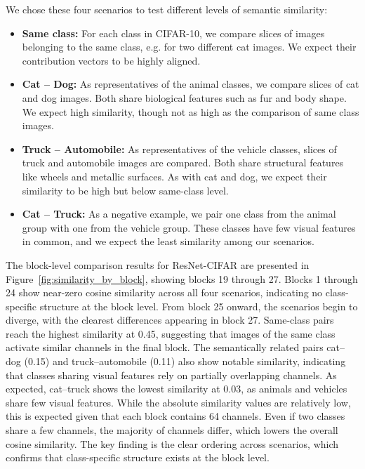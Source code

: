 \documentclass[
12pt,
fancyheadings,
a4paper,
twoside,
BCOR=0.7cm,
nobcorignoretitle,
grayscalebody,
]{stsreprt}
\begin{document}
We chose these four scenarios to test different levels of semantic similarity:
\begin{itemize}
    \item \textbf{Same class:} For each class in CIFAR-10, we compare slices of images belonging to the same class, e.g. for two different cat images. We expect their contribution vectors to be highly aligned.
    \item \textbf{Cat -- Dog:} As representatives of the animal classes, we compare slices of cat and dog images. Both share biological features such as fur and body shape. We expect high similarity, though not as high as the comparison of same class images.
    \item \textbf{Truck -- Automobile:} As representatives of the vehicle classes, slices of truck and automobile images are compared. Both share structural features like wheels and metallic surfaces. As with cat and dog, we expect their similarity to be high but below same-class level.
    \item \textbf{Cat -- Truck:} As a negative example, we pair one class from the animal group with one from the vehicle group. These classes have few visual features in common, and we expect the least similarity among our scenarios.
\end{itemize}

The block-level comparison results for ResNet-CIFAR are presented in
Figure~\ref{fig:similarity_by_block}, showing blocks 19 through 27. Blocks 1 through 24 show
near-zero cosine similarity across all four scenarios, indicating no class-specific structure at
the block level. From block 25 onward, the scenarios begin to diverge, with the clearest
differences appearing in block 27. Same-class pairs reach the highest similarity at 0.45,
suggesting that images of the same class activate similar channels in the final block. The
semantically related pairs cat--dog (0.15) and truck--automobile (0.11) also show notable
similarity, indicating that classes sharing visual features rely on partially overlapping channels.
As expected, cat--truck shows the lowest similarity at 0.03, as animals and vehicles share few
visual features.
While the absolute similarity values are relatively low, this is expected given that each block
contains 64 channels. Even if two classes share a few channels, the majority of channels differ,
which lowers the overall cosine similarity. The key finding is the clear ordering across scenarios,
which confirms that class-specific structure exists at the block level.
\end{document}
